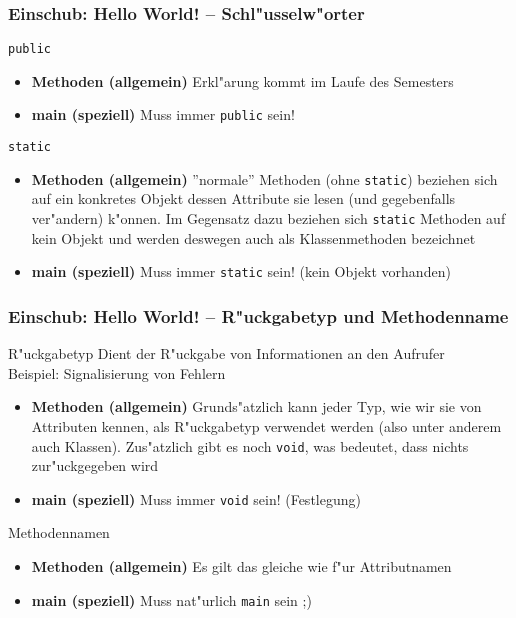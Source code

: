 \documentclass{beamer}
\begin{document}
\begin{frame}
\frametitle{Einschub: Hello World! -- Schl"usselw"orter}
\begin{block}{\texttt{public}}
\begin{itemize}
\item \textbf{Methoden (allgemein)} Erkl"arung kommt im Laufe des Semesters
\item \textbf{main (speziell)} Muss immer \texttt{public} sein!
\end{itemize}
\end{block}

\pause

\begin{block}{\texttt{static}}
\begin{itemize}
\item \textbf{Methoden (allgemein)} ''normale'' Methoden (ohne \texttt{static}) beziehen sich auf ein konkretes Objekt dessen Attribute sie lesen (und gegebenfalls ver"andern) k"onnen. Im Gegensatz dazu beziehen sich \texttt{static} Methoden auf \alert{kein Objekt} und werden deswegen auch als Klassenmethoden bezeichnet
\item \textbf{main (speziell)} Muss immer \texttt{static} sein! (kein Objekt vorhanden)
\end{itemize}
\end{block}
\end{frame}


\begin{frame}
\frametitle{Einschub: Hello World! -- R"uckgabetyp und Methodenname}
\begin{block}{R"uckgabetyp}
Dient der R"uckgabe von Informationen an den Aufrufer\\
Beispiel: Signalisierung von Fehlern\\
\begin{itemize}
\item \textbf{Methoden (allgemein)} Grunds"atzlich kann jeder Typ, wie wir sie von Attributen kennen, als R"uckgabetyp verwendet werden (also unter anderem auch Klassen). Zus"atzlich gibt es noch \texttt{void}, was bedeutet, dass nichts zur"uckgegeben wird
\item \textbf{main (speziell)} Muss immer \texttt{void} sein! (Festlegung)
\end{itemize}
\end{block}

\pause

\begin{block}{Methodennamen}
\begin{itemize}
\item \textbf{Methoden (allgemein)} Es gilt das gleiche wie f"ur Attributnamen
\item \textbf{main (speziell)} Muss nat"urlich \texttt{main} sein ;)
\end{itemize}
\end{block}
\end{frame}
\end{document}
